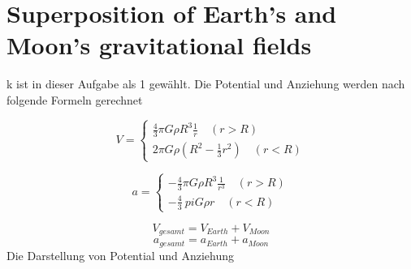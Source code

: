 \documentclass[12pt]{article}
\begin{document}
	\pagestyle{main}
\tableofcontents
\newpage
\section{Superposition of Earth's and Moon's gravitational fields}
k ist in dieser Aufgabe als 1 gewählt. Die Potential und Anziehung werden nach folgende Formeln gerechnet

\[ V = \begin{cases}
\frac{4}{3} \pi G \rho R^3 \frac{1}{r} \quad (r > R)\\
2 \pi G \rho (R^2 - \frac{1}{3} r^2) \quad  (r < R)
\end{cases} \]

\[ a = \begin{cases}
- \frac{4}{3} \pi G \rho R^3 \frac{1}{r^3} \quad (r > R)\\
- \frac{4}{3} \ pi G \rho r \quad (r < R)
\end{cases}
\]

\begin{equation*}
V_{gesamt} = V_{Earth} + V_{Moon}
\end{equation*}
\begin{equation*}
a_{gesamt} = a_{Earth} + a_{Moon}
\end{equation*}
Die Darstellung von Potential und Anziehung 
\newpage
\end{document}
